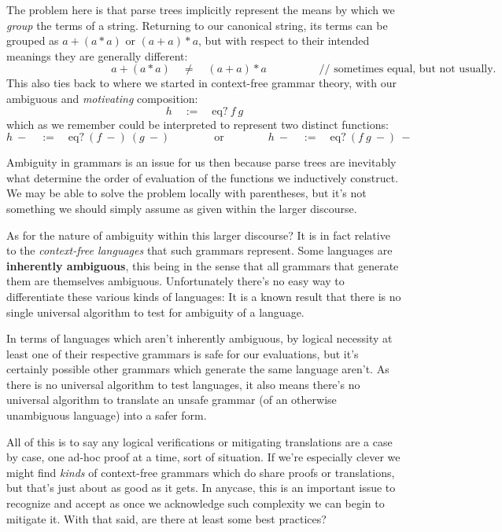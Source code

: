 \documentclass[twoside]{article}
\newcommand{\qdefeq}{\ensuremath{\quad :=\quad}}
\newcommand{\strong}[1]{{\bfseries #1}}
\newcommand{\twoqquad}{\ensuremath{\qquad\qquad}}
\newcommand{\tab}[1][1.125cm]{\hspace{#1}}
\newcommand{\cbox}[1]{\mbox{// #1}}
\newcommand{\eq}{\mbox{eq?}}
\begin{document}
The problem here is that parse trees implicitly represent the means by which we \emph{group} the terms of a string.
Returning to our canonical string, its terms can be grouped as $ a+(a*a) $ or $ (a+a)*a $, but with respect to
their intended meanings they are generally different:
$$ \tab[4cm] a+(a*a) \quad \neq \quad (a+a)*a \tab[2cm] \cbox{sometimes equal, but not usually.} $$
This also ties back to where we started in context-free grammar theory, with our ambiguous and \emph{motivating} composition:
$$ h \qdefeq \eq\ f\ g $$
which as we remember could be interpreted to represent two distinct functions:
$$ h\ - \qdefeq \eq\ (f\ -)\ (g\ -) \twoqquad \mbox{or} \twoqquad h\ - \qdefeq \eq\ (f\ g\ -)\ - $$

Ambiguity in grammars is an issue for us then because parse trees are inevitably what determine the order of evaluation
of the functions we inductively construct. We may be able to solve the problem locally with parentheses, but it's not
something we should simply assume as given within the larger discourse.

As for the nature of ambiguity within this larger discourse? It is in fact relative to the \emph{context-free languages}
that such grammars represent. Some languages are \strong{inherently ambiguous}, this being in the sense that all grammars
that generate them are themselves ambiguous. Unfortunately there's no easy way to differentiate these various kinds
of languages: It is a known result that there is no single universal algorithm to test for ambiguity of a language.

In terms of languages which aren't inherently ambiguous, by logical necessity at least one of their respective grammars
is safe for our evaluations, but it's certainly possible other grammars which generate the same language aren't. As there
is no universal algorithm to test languages, it also means there's no universal algorithm to translate an unsafe grammar
(of an otherwise unambiguous language) into a safer form.

All of this is to say any logical verifications or mitigating translations are a case by case, one ad-hoc proof at a time,
sort of situation. If we're especially clever we might find \emph{kinds} of context-free grammars which do share proofs
or translations, but that's just about as good as it gets. In anycase, this is an important issue to recognize and accept
as once we acknowledge such complexity we can begin to mitigate it. With that said, are there at least some best practices?
\end{document}
